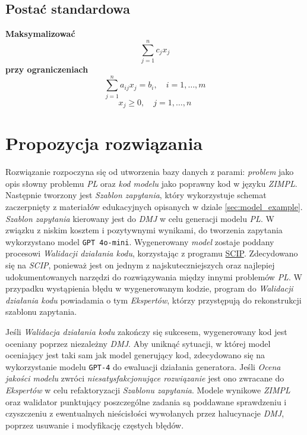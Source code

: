 \newpage

\subsection{Postać standardowa}

    \noindent
    \textbf{Maksymalizować}
    \[
    \sum_{j=1}^{n} c_j x_j \tag{9}
    \]
    \textbf{przy ograniczeniach}
    \[
    \sum_{j=1}^{n} a_{ij} x_j = b_i, \quad i = 1, \dots, m \tag{10}
    \]
    \[
    x_j \geq 0, \quad j = 1, \dots, n \tag{11}
    \]



\section{Propozycja rozwiązania}

Rozwiązanie rozpoczyna się od utworzenia bazy danych z parami: \textit{problem} jako opis słowny problemu \textit{PL} oraz \textit{kod modelu} jako poprawny kod w języku \textit{ZIMPL}. Następnie tworzony jest \textit{Szablon zapytania}, który wykorzystuje schemat zaczerpnięty z materiałów edukacyjnych opisanych w dziale \ref{sec:model_example}. \textit{Szablon zapytania} kierowany jest do \textit{DMJ} w celu generacji modelu \textit{PL}. W związku z niskim kosztem i pozytywnymi wynikami, do tworzenia zapytania wykorzystano model \texttt{GPT 4o-mini}. Wygenerowany \textit{model} zostaje poddany procesowi \textit{Walidacji działania kodu}, korzystając z programu \href{https://www.scipopt.org/}{SCIP}. Zdecydowano się na \textit{SCIP}, ponieważ jest on jednym z najskuteczniejszych oraz najlepiej udokumentowanych narzędzi do rozwiązywania między innymi problemów \textit{PL}. W przypadku wystąpienia błędu w wygenerowanym kodzie, program do \textit{Walidacji działania kodu} powiadamia o tym \textit{Ekspertów}, którzy przystępują do rekonstrukcji szablonu zapytania.

Jeśli \textit{Walidacja działania kodu} zakończy się sukcesem, wygenerowany kod jest oceniany poprzez niezależny \textit{DMJ}. Aby uniknąć sytuacji, w której model oceniający jest taki sam jak model generujący kod, zdecydowano się na wykorzystanie modelu \texttt{GPT-4} do ewaluacji działania generatora. Jeśli \textit{Ocena jakości modelu} zwróci \textit{niesatysfakcjonujące rozwiązanie} jest ono zwracane do \textit{Ekspertów} w celu refaktoryzacji \textit{Szablonu zapytania}. Modele wynikowe \textit{ZIMPL} oraz walidator punktujący poszczególne zadania są poddawane sprawdzeniu i czyszczeniu z ewentualnych nieścisłości wywołanych przez halucynacje \textit{DMJ}, poprzez usuwanie i modyfikację częstych błędów.

